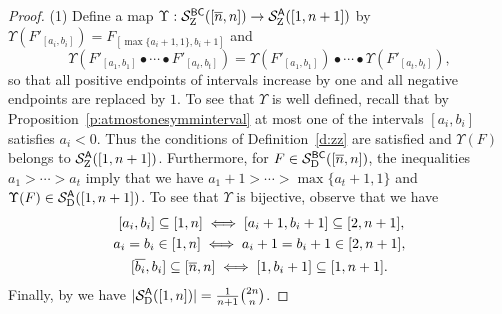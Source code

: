 \documentclass[11pt]{article}
\theoremstyle{definition}
\numberwithin{equation}{section}
\begin{document}
\begin{proof}
  (1) Define a map
  $\Upsilon: \mathcal S^{\mathsf{BC}}_{\mathrm Z}([\overline{n}, n]) \rightarrow \mathcal S^{\mathsf{A}}_{\mathrm Z}([1, n+1])$ by
  $\Upsilon(F'_{[a_i,b_i]}) = F_{[\max\{a_i+1,1\},b_i+1]}$ and
  \begin{equation*}
      \Upsilon(F'_{[a_1,b_1]} \bullet \cdots \bullet F'_{[a_t,b_t]})
      =
    \Upsilon(F'_{[a_1, b_1]}) \bullet \cdots \bullet \Upsilon(F'_{[a_t,b_t]}),
  \end{equation*}
  so that all positive endpoints of intervals increase by one
  and all negative endpoints are replaced by $1$.
  To see that $\Upsilon$ is well defined, recall
  that by Proposition~\ref{p:atmostonesymminterval}
  at most one of the intervals $[a_i,b_i]$ satisfies $a_i < 0$.
  Thus the conditions of Definition~\ref{d:zz} are satisfied
  and $\Upsilon(F)$ belongs to $\mathcal S^{\mathsf{A}}_{\mathrm Z}([1,n+1])$.
  Furthermore, for $F \in \mathcal S^{\mathsf{BC}}_{\mathrm D}([\overline{n}, n])$,
  the inequalities $a_1 > \cdots > a_t$ imply that we have
  $a_1 + 1 > \cdots > \max\{a_t + 1, 1\}$ and
  $\Upsilon(F) \in \mathcal S^{\mathsf{A}}_{\mathrm D}([1,n+1])$.
  To see that $\Upsilon$ is bijective, observe that we have
  \begin{equation*}
  \begin{gathered}
    \;[a_i,b_i] \subseteq [1,n] \;\Longleftrightarrow\;
      [a_i+1,b_i+1] \subseteq [2,n+1],\\
  a_i = b_i \in [1,n] \;\Longleftrightarrow\; a_i+1 = b_i+1 \in [2,n+1], \\
  [\ol{b_i},b_i] \subseteq [\ol n, n] \;\Longleftrightarrow\;
  [1,b_i+1] \subseteq [1,n+1].
  \end{gathered}
\end{equation*}
  Finally, by \cite[Thm.\,3.6]{CHSSkanEKL} we have
  $|\mathcal S^{\mathsf{A}}_{\mathrm D}([1,n])| = \tfrac 1{n+1} \tbinom{2n}n$.
\end{proof}
\end{document}
